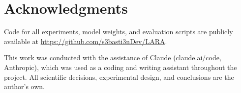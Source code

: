 \documentclass{article}
\begin{document}
\section*{Acknowledgments}

Code for all experiments, model weights, and evaluation scripts are publicly available at \url{https://github.com/s3basti3nDev/LARA}.

This work was conducted with the assistance of Claude (claude.ai/code, Anthropic), which was used as a coding and writing assistant throughout the project. All scientific decisions, experimental design, and conclusions are the author's own.



\end{document}
